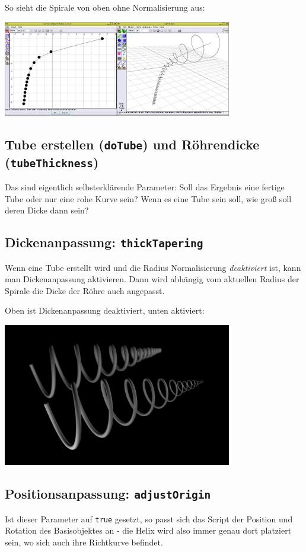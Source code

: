 \documentclass[12pt,a4paper]{scrartcl}
\begin{document}
So sieht die Spirale von oben ohne Normalisierung aus:
\begin{center}
	\includegraphics[width=0.75\textwidth]{../pics/dichte-comp-2.jpg}
\end{center}

\subsection{Tube erstellen (\texttt{doTube}) und Röhrendicke (\texttt{tubeThickness})}
Das sind eigentlich selbsterklärende Parameter: Soll das Ergebnis eine
fertige Tube oder nur eine rohe Kurve sein? Wenn es eine Tube sein soll,
wie groß soll deren Dicke dann sein?

\subsection{Dickenanpassung: \texttt{thickTapering}}
Wenn eine Tube erstellt wird und die Radius Normalisierung \emph{deaktiviert}
ist, kann man Dickenanpassung aktivieren. Dann wird abhängig vom aktuellen
Radius der Spirale die Dicke der Röhre auch angepasst.

\pagebreak

Oben ist Dickenanpassung deaktiviert, unten aktiviert:
\begin{center}
	\includegraphics[width=0.75\textwidth]{../pics/thicknessTapering.jpg}
\end{center}

\subsection{Positionsanpassung: \texttt{adjustOrigin}}
Ist dieser Parameter auf \texttt{true} gesetzt, so passt sich das Script
der Position und Rotation des Basisobjektes an - die Helix wird also
immer genau dort platziert sein, wo sich auch ihre Richtkurve befindet.
\end{document}
